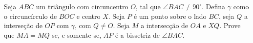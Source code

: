 Seja $ABC$ um triângulo com circuncentro $O$, tal que $\angle BAC \neq 90^\circ$. Defina $\gamma$ como o
circuncírculo de $BOC$ e centro $X$. Seja $P$ é um ponto sobre o lado $BC$, seja $Q$ a interseção de $OP$ com $\gamma$, com $Q \neq O$. Seja $M$ a intersecção de $OA$ e $XQ$. Prove que $MA = MQ$ se, e somente se, $AP$ é a bissetriz de $\angle BAC$.
